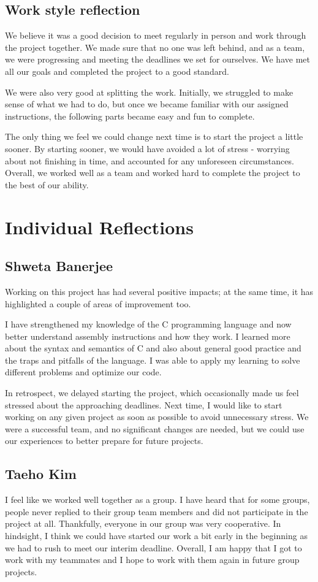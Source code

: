 \documentclass[11pt]{article}
\begin{document}
\subsection{Work style reflection}
We believe it was a good decision to meet regularly in person and work through the project together. We made sure that no one was left behind, and as a team, we were progressing and meeting the deadlines we set for ourselves. We have met all our goals and completed the project to a good standard. 

We were also very good at splitting the work. Initially, we struggled to make sense of what we had to do, but once we became familiar with our assigned instructions, the following parts became easy and fun to complete. 

The only thing we feel we could change next time is to start the project a little sooner. By starting sooner, we would have avoided a lot of stress - worrying about not finishing in time, and accounted for any unforeseen circumstances. Overall, we worked well as a team and worked hard to complete the project to the best of our ability. 

\section{Individual Reflections}
\subsection*{Shweta Banerjee}
Working on this project has had several positive impacts; at the same time, it has highlighted a couple of areas of improvement too. 

I have strengthened my knowledge of the C programming language and now better understand assembly instructions and how they work. I learned more about the syntax and semantics of C and also about general good practice and the traps and pitfalls of the language. I was able to apply my learning to solve different problems and optimize our code. 

In retrospect, we delayed starting the project, which occasionally made us feel stressed about the approaching deadlines. Next time, I would like to start working on any given project as soon as possible to avoid unnecessary stress. We were a successful team, and no significant changes are needed, but we could use our experiences to better prepare for future projects. 

\subsection*{Taeho Kim}
I feel like we worked well together as a group. I have heard that for some groups, people never replied to their group team members and did not participate in the project at all. Thankfully, everyone in our group was very cooperative. In hindsight, I think we could have started our work a bit early in the beginning as we had to rush to meet our interim deadline. Overall, I am happy that I got to work with my teammates and I hope to work with them again in future group projects. 
\end{document}
